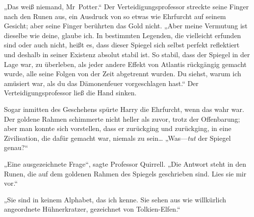 „Das weiß niemand, Mr~Potter.“ Der Verteidigungsprofessor streckte seine Finger nach den Runen aus, ein Ausdruck von so etwas wie Ehrfurcht auf seinem Gesicht; aber seine Finger berührten das Gold nicht. „Aber meine Vermutung ist dieselbe wie deine, glaube ich. In bestimmten Legenden, die vielleicht erfunden sind oder auch nicht, heißt es, dass dieser Spiegel sich selbst perfekt reflektiert und deshalb in seiner Existenz absolut stabil ist. So stabil, dass der Spiegel in der Lage war, zu überleben, als jeder andere Effekt von Atlantis rückgängig gemacht wurde, alle seine Folgen von der Zeit abgetrennt wurden. Du siehst, warum ich amüsiert war, als du das Dämonenfeuer vorgeschlagen hast.“
Der Verteidigungsprofessor ließ die Hand sinken.

Sogar inmitten des Geschehens spürte Harry die Ehrfurcht, wenn das wahr war. Der goldene Rahmen schimmerte nicht heller als zuvor, trotz der Offenbarung; aber man konnte sich vorstellen, dass er zurückging und zurückging, in eine Zivilisation, die dafür gemacht war, niemals zu sein…
„Was—\emph{tut} der Spiegel genau?“

„Eine ausgezeichnete Frage“, sagte Professor Quirrell. „Die Antwort steht in den Runen, die auf dem goldenen Rahmen des Spiegels geschrieben sind. Lies sie mir vor.“

„Sie sind in keinem Alphabet, das ich kenne. Sie sehen aus wie willkürlich angeordnete Hühnerkratzer, gezeichnet von Tolkien-Elfen.“

